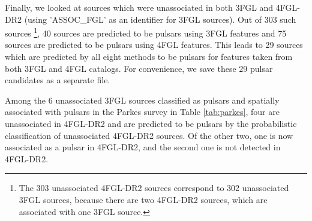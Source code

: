 Finally, we looked at sources which were unassociated in both 3FGL and 4FGL-DR2 (using 'ASSOC\_FGL' as an identifier for 3FGL sources). Out of 303 such sources%
\footnote{The 303 unassociated 4FGL-DR2 sources correspond to 302 unassociated 3FGL sources, because there are two 4FGL-DR2 sources, which are associated with one 3FGL source.},
40 sources are predicted to be pulsars using 3FGL features and 75 sources are predicted to be pulsars using 4FGL features. This leads to 29 sources which are predicted by all eight methods to be pulsars for features taken from both 3FGL and 4FGL catalogs. 
For convenience, we save these 29 pulsar candidates as a separate file.

Among the 6 unassociated 3FGL sources classified as pulsars and spatially associated with pulsars in the Parkes survey in Table \ref{tab:parkes}, four are unassociated in 4FGL-DR2 and are predicted to be pulsars by the probabilistic classification of unassociated 4FGL-DR2 sources. Of the other two, one is now associated as a pulsar in 4FGL-DR2, and the second one is not detected in 4FGL-DR2. 



